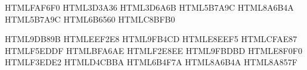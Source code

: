
\usepackage[margin=1in]{geometry}
\usepackage{parskip}        %
\usepackage{microtype}      %

\usepackage{xcolor}
\definecolor{pagebg}       {HTML}{FAF6F0}  %
\definecolor{bodyfg}       {HTML}{3D3A36}  %
\definecolor{heading}      {HTML}{3D6A6B}  %
\definecolor{subheading}   {HTML}{5B7A9C}  %
\definecolor{accent}       {HTML}{8A6B4A}  %
\definecolor{linkcol}      {HTML}{5B7A9C}  %
\definecolor{mutedtext}    {HTML}{6B6560}  %
\definecolor{rulecol}      {HTML}{C8BFB0}  %

\definecolor{defnFrame}    {HTML}{9DB89B}  \definecolor{defnBack}    {HTML}{EEF2E8}
\definecolor{ideaFrame}    {HTML}{9FB4CD}  \definecolor{ideaBack}    {HTML}{E8EEF5}
\definecolor{warnFrame}    {HTML}{CFAE87}  \definecolor{warnBack}    {HTML}{F5EDDF}
\definecolor{noteFrame}    {HTML}{BFA6AE}  \definecolor{noteBack}    {HTML}{F2E8EE}
\definecolor{exFrame}      {HTML}{9FBDBD}  \definecolor{exBack}      {HTML}{E8F0F0}
\definecolor{codeBack}     {HTML}{F3EDE2}
\definecolor{codeBorder}   {HTML}{D4CBBA}
\definecolor{codeKeyword}  {HTML}{6B4F7A}
\definecolor{codeString}   {HTML}{8A6B4A}
\definecolor{codeComment}  {HTML}{8A857F}

\usepackage{pagecolor}
\pagecolor{pagebg}
\color{bodyfg}

\usepackage[T1]{fontenc}

\usepackage{hyperref}

